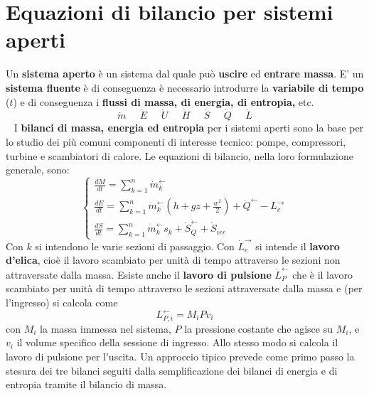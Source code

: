 \section{Equazioni di bilancio per sistemi aperti}
Un \textbf{sistema aperto} è un sistema dal quale può \textbf{uscire} ed \textbf{entrare massa}.\newline
\newline
E' un \textbf{sistema fluente} è di conseguenza è necessario introdurre la \textbf{variabile di tempo} ($t$) e di conseguenza i \textbf{flussi di massa, di energia, di entropia,} etc.
\[
    \dot{m} \;\;\;\;\; \dot{E}\;\;\;\;\; \dot{U} \;\;\;\;\; \dot{H} \;\;\;\;\; \dot{S} \;\;\;\;\; \dot{Q} \;\;\;\;\; \dot{L}
\]
\ \newline
I \textbf{bilanci di massa, energia ed entropia} per i sistemi aperti sono la base per lo studio dei più
comuni componenti di interesse tecnico: pompe, compressori, turbine e scambiatori di calore. \newline
\newline
Le equazioni di bilancio, nella loro formulazione generale, sono:
\[
    \begin{cases}
        \frac{dM}{dt} = \sum_{k=1}^{n}\dot{m}_k^\leftarrow \\
        \frac{dE}{dt} = \sum_{k=1}^{n}\dot{m}_k^\leftarrow  \left(h + gz + \frac{w^2}{2}\right) + \dot{Q}^\leftarrow  - L_e^\rightarrow \\
        \frac{dS}{dt} = \sum_{k=1}^{n} \dot{m}_k^\leftarrow  s_k + \dot{S}_Q^\leftarrow + \dot{S}_{irr}
    \end{cases}
\]
Con $k$ si intendono le varie sezioni di passaggio.\newline
Con $\dot{L}_e^\rightarrow $ si intende il \textbf{lavoro d'elica}, cioè il lavoro scambiato per unità di tempo attraverso le sezioni non attraversate dalla massa.\newline 
Esiste anche il \textbf{lavoro di pulsione} $\dot{L}_P^\leftarrow $ che è il lavoro scambiato per unità di tempo attraverso le sezioni attraversate dalla massa e (per l'ingresso) si calcola come
\[
    L_{P,i}^\leftarrow  = M_i P v_i
\]
con $M_i$ la massa immessa nel sistema, $P$ la pressione costante che agisce su $M_i$, e $v_i$ il volume specifico della sessione di ingresso. Allo stesso modo si calcola il lavoro di pulsione per l'uscita.\newline
\newline
Un approccio tipico prevede come primo passo la stesura dei tre bilanci seguiti dalla semplificazione dei bilanci di energia e di entropia tramite il bilancio di massa.
